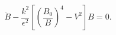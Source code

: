 \begin{equation}
\ddot B - \frac{k^2}{\epsilon^2}\left[
   \left(\frac{B_0}{B}\right)^4 - V^2 \right] B = 0. 
\label{Beq}
\end{equation}

